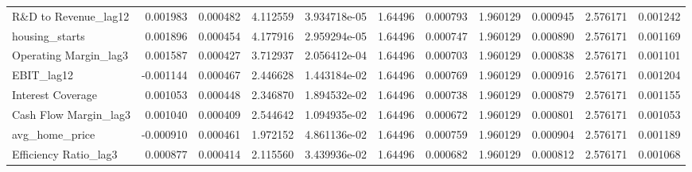 \documentclass[12pt,a4paper,english]{article}
\begin{document}
{{\begin{tabular}{@{}lrrrrrrrrrr@{}}
			R\&D to Revenue\_lag12        & 0.001983                 & 0.000482                    & 4.112559                  & 3.934718e-05                             & 1.64496                       & 0.000793                      & 1.960129                     & 0.000945                     & 2.576171                     & 0.001242                     \\
			housing\_starts               & 0.001896                 & 0.000454                    & 4.177916                  & 2.959294e-05                             & 1.64496                       & 0.000747                      & 1.960129                     & 0.000890                     & 2.576171                     & 0.001169                     \\
			Operating Margin\_lag3        & 0.001587                 & 0.000427                    & 3.712937                  & 2.056412e-04                             & 1.64496                       & 0.000703                      & 1.960129                     & 0.000838                     & 2.576171                     & 0.001101                     \\
			EBIT\_lag12                   & -0.001144                & 0.000467                    & 2.446628                  & 1.443184e-02                             & 1.64496                       & 0.000769                      & 1.960129                     & 0.000916                     & 2.576171                     & 0.001204                     \\
			Interest Coverage             & 0.001053                 & 0.000448                    & 2.346870                  & 1.894532e-02                             & 1.64496                       & 0.000738                      & 1.960129                     & 0.000879                     & 2.576171                     & 0.001155                     \\
			Cash Flow Margin\_lag3        & 0.001040                 & 0.000409                    & 2.544642                  & 1.094935e-02                             & 1.64496                       & 0.000672                      & 1.960129                     & 0.000801                     & 2.576171                     & 0.001053                     \\
			avg\_home\_price              & -0.000910                & 0.000461                    & 1.972152                  & 4.861136e-02                             & 1.64496                       & 0.000759                      & 1.960129                     & 0.000904                     & 2.576171                     & 0.001189                     \\
			Efficiency Ratio\_lag3        & 0.000877                 & 0.000414                    & 2.115560                  & 3.439936e-02                             & 1.64496                       & 0.000682                      & 1.960129                     & 0.000812                     & 2.576171                     & 0.001068                     \\ \bottomrule
		\end{tabular}%
	}
}
\end{document}
